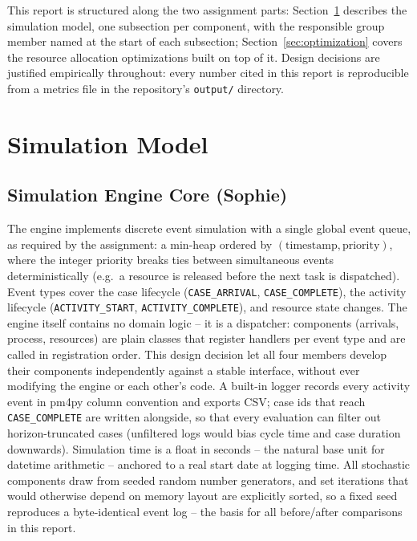 \documentclass[
  english,        %
  font=times,     %
  twocolumn,      %
]{tumarticle}
\begin{document}
This report is structured along the two assignment parts:
Section~\ref{sec:simulation} describes the simulation model, one subsection
per component, with the responsible group member named at the start of each
subsection; Section~\ref{sec:optimization} covers the resource allocation
optimizations built on top of it. Design decisions are justified empirically
throughout: every number cited in this report is reproducible from a metrics
file in the repository's \texttt{output/} directory.

\section{Simulation Model}
\label{sec:simulation}

\subsection{Simulation Engine Core (Sophie)}
The engine implements discrete event simulation with a single global event
queue, as required by the assignment: a min-heap ordered by
$(\text{timestamp}, \text{priority})$, where the integer priority breaks
ties between simultaneous events deterministically (e.g.\ a resource is
released before the next task is dispatched). Event types cover the case
lifecycle (\texttt{CASE\_ARRIVAL}, \texttt{CASE\_COMPLETE}), the activity
lifecycle (\texttt{ACTIVITY\_START}, \texttt{ACTIVITY\_COMPLETE}), and
resource state changes. The engine itself contains no domain logic -- it is
a dispatcher: components (arrivals, process, resources) are plain classes
that register handlers per event type and are called in registration order.
This design decision let all four members develop their components
independently against a stable interface, without ever modifying the engine
or each other's code. A built-in logger records every activity event in
pm4py column convention and exports CSV; case ids that reach
\texttt{CASE\_COMPLETE} are written alongside, so that every evaluation can
filter out horizon-truncated cases (unfiltered logs would bias cycle time
and case duration downwards). Simulation time is a float in seconds --
the natural base unit for datetime arithmetic -- anchored to a real start
date at logging time. All stochastic components draw from seeded random
number generators, and set iterations that would otherwise depend on memory
layout are explicitly sorted, so a fixed seed reproduces a byte-identical
event log -- the basis for all before/after comparisons in this report.
\end{document}
